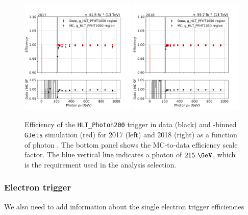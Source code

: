 \begin{figure}[hbtp]\begin{center}
    \includegraphics[width=0.49\textwidth]{fig/efficiency/trigger/photon/data_mc_comparison_g_HLT_PFHT1050_2017.pdf}
    \includegraphics[width=0.49\textwidth]{fig/efficiency/trigger/photon/data_mc_comparison_g_HLT_PFHT1050_2018.pdf}
    \caption{Efficiency of the \texttt{HLT\_Photon200} trigger in data (black) and \HT-binned \texttt{GJets} simulation (red) for 2017 (left) and 2018 (right) as a function of photon \pt. The bottom panel shows the MC-to-data efficiency scale factor. The blue vertical line indicates a photon \pt of $215~\GeV$, which is the requirement used in the analysis selection.}
    \label{fig:hlteff_photon}
 \end{center}\end{figure}

 \subsubsection{Electron trigger}
{\color{red} We also need to add information about the single electron trigger efficiencies}